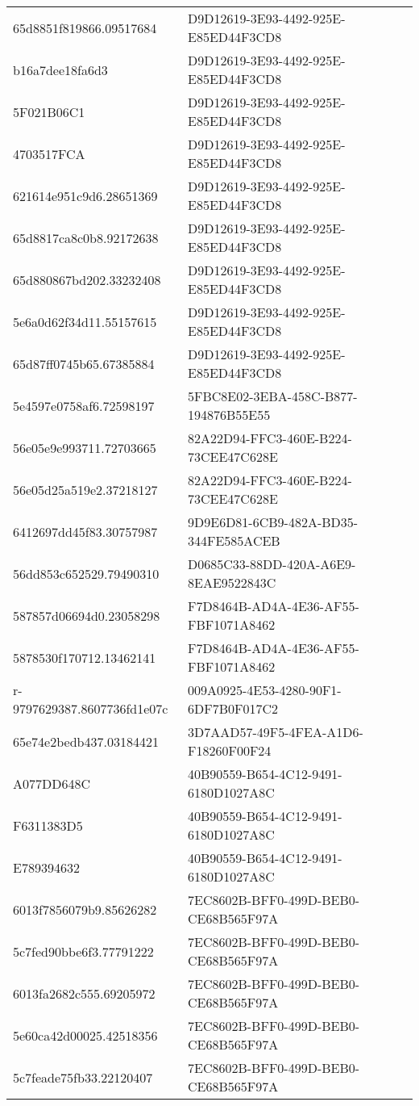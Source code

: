 \begin{tabular}{ll}
65d8851f819866.09517684 & D9D12619-3E93-4492-925E-E85ED44F3CD8 \\
b16a7dee18fa6d3 & D9D12619-3E93-4492-925E-E85ED44F3CD8 \\
5F021B06C1 & D9D12619-3E93-4492-925E-E85ED44F3CD8 \\
4703517FCA & D9D12619-3E93-4492-925E-E85ED44F3CD8 \\
621614e951c9d6.28651369 & D9D12619-3E93-4492-925E-E85ED44F3CD8 \\
65d8817ca8c0b8.92172638 & D9D12619-3E93-4492-925E-E85ED44F3CD8 \\
65d880867bd202.33232408 & D9D12619-3E93-4492-925E-E85ED44F3CD8 \\
5e6a0d62f34d11.55157615 & D9D12619-3E93-4492-925E-E85ED44F3CD8 \\
65d87ff0745b65.67385884 & D9D12619-3E93-4492-925E-E85ED44F3CD8 \\
5e4597e0758af6.72598197 & 5FBC8E02-3EBA-458C-B877-194876B55E55 \\
56e05e9e993711.72703665 & 82A22D94-FFC3-460E-B224-73CEE47C628E \\
56e05d25a519e2.37218127 & 82A22D94-FFC3-460E-B224-73CEE47C628E \\
6412697dd45f83.30757987 & 9D9E6D81-6CB9-482A-BD35-344FE585ACEB \\
56dd853c652529.79490310 & D0685C33-88DD-420A-A6E9-8EAE9522843C \\
587857d06694d0.23058298 & F7D8464B-AD4A-4E36-AF55-FBF1071A8462 \\
5878530f170712.13462141 & F7D8464B-AD4A-4E36-AF55-FBF1071A8462 \\
r-9797629387.8607736fd1e07c & 009A0925-4E53-4280-90F1-6DF7B0F017C2 \\
65e74e2bedb437.03184421 & 3D7AAD57-49F5-4FEA-A1D6-F18260F00F24 \\
A077DD648C & 40B90559-B654-4C12-9491-6180D1027A8C \\
F6311383D5 & 40B90559-B654-4C12-9491-6180D1027A8C \\
E789394632 & 40B90559-B654-4C12-9491-6180D1027A8C \\
6013f7856079b9.85626282 & 7EC8602B-BFF0-499D-BEB0-CE68B565F97A \\
5c7fed90bbe6f3.77791222 & 7EC8602B-BFF0-499D-BEB0-CE68B565F97A \\
6013fa2682c555.69205972 & 7EC8602B-BFF0-499D-BEB0-CE68B565F97A \\
5e60ca42d00025.42518356 & 7EC8602B-BFF0-499D-BEB0-CE68B565F97A \\
5c7feade75fb33.22120407 & 7EC8602B-BFF0-499D-BEB0-CE68B565F97A \\

\end{tabular}
